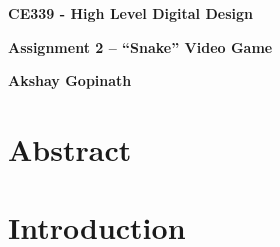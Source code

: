 \documentclass[aps, secnumarabic, balancelastpage, asmath, amssymb, nofootinbib, floatfix,]{revtex4-2}
\begin{document}


\thispagestyle{plain}
\begin{center}
    \Large
    \textbf{CE339 - High Level Digital Design}
        
    \vspace{0.4cm}
    \large
    \textbf{Assignment 2 -- ``Snake'' Video Game}
        
    \vspace{0.4cm}
    \textbf{Akshay Gopinath}
       
    \section*{Abstract}
    \fontsize{11pt}{12pt}\selectfont
    
\end{center}
\fontsize{11pt}{12pt}\selectfont
{
\setlength{\parindent}{0pt}


}
\clearpage

\tableofcontents

\clearpage

\listoffigures
\clearpage


\clearpage


\section{\fontsize{11.3pt}{12pt}\selectfont \bf Introduction}
\fontsize{11pt}{12pt}\selectfont
\label{sec:1}
\end{document}
